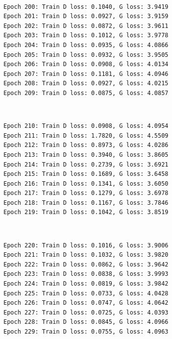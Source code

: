 \documentclass[11pt]{article}
\begin{document}
    \begin{center}
    \end{center}
    { \hspace*{\fill} \\}
    
    \begin{Verbatim}[commandchars=\\\{\}]
Epoch 200: Train D loss: 0.1040, G loss: 3.9419
Epoch 201: Train D loss: 0.0927, G loss: 3.9159
Epoch 202: Train D loss: 0.0872, G loss: 3.9611
Epoch 203: Train D loss: 0.1012, G loss: 3.9778
Epoch 204: Train D loss: 0.0935, G loss: 4.0866
Epoch 205: Train D loss: 0.0932, G loss: 3.9505
Epoch 206: Train D loss: 0.0908, G loss: 4.0134
Epoch 207: Train D loss: 0.1181, G loss: 4.0946
Epoch 208: Train D loss: 0.0927, G loss: 4.0215
Epoch 209: Train D loss: 0.0875, G loss: 4.0857

    \end{Verbatim}

    \begin{center}
    \end{center}
    { \hspace*{\fill} \\}
    
    \begin{Verbatim}[commandchars=\\\{\}]
Epoch 210: Train D loss: 0.0908, G loss: 4.0954
Epoch 211: Train D loss: 1.7820, G loss: 4.5509
Epoch 212: Train D loss: 0.8973, G loss: 4.0286
Epoch 213: Train D loss: 0.3940, G loss: 3.8605
Epoch 214: Train D loss: 0.2739, G loss: 3.6921
Epoch 215: Train D loss: 0.1689, G loss: 3.6458
Epoch 216: Train D loss: 0.1341, G loss: 3.6050
Epoch 217: Train D loss: 0.1279, G loss: 3.6978
Epoch 218: Train D loss: 0.1167, G loss: 3.7846
Epoch 219: Train D loss: 0.1042, G loss: 3.8519

    \end{Verbatim}

    \begin{center}
    \end{center}
    { \hspace*{\fill} \\}
    
    \begin{Verbatim}[commandchars=\\\{\}]
Epoch 220: Train D loss: 0.1016, G loss: 3.9006
Epoch 221: Train D loss: 0.1032, G loss: 3.9820
Epoch 222: Train D loss: 0.0862, G loss: 3.9642
Epoch 223: Train D loss: 0.0838, G loss: 3.9993
Epoch 224: Train D loss: 0.0819, G loss: 3.9842
Epoch 225: Train D loss: 0.0733, G loss: 4.0428
Epoch 226: Train D loss: 0.0747, G loss: 4.0642
Epoch 227: Train D loss: 0.0725, G loss: 4.0393
Epoch 228: Train D loss: 0.0845, G loss: 4.0966
Epoch 229: Train D loss: 0.0755, G loss: 4.0963

    \end{Verbatim}
\end{document}
